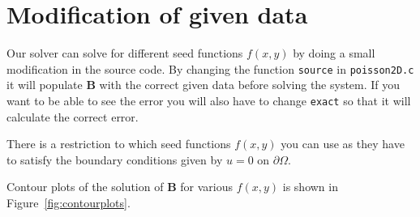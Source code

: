 
\section{Modification of given data} %
\label{sec:modification_of_given_data}
Our solver can solve for different seed functions $f(x,y)$ by doing a small modification in the source code. By changing the function \texttt{source} in \texttt{poisson2D.c} it will populate \textbf{B} with the correct given data before solving the system. If you want to be able to see the error you will also have to change \texttt{exact} so that it will calculate the correct error.

There is a restriction to which seed functions $f(x,y)$ you can use as they have to satisfy the boundary conditions given by $u = 0$ on $\partial\Omega$.

Contour plots of the solution of $\mathbf{B}$ for various $f(x,y)$ is shown in Figure~\ref{fig:contourplots}.


